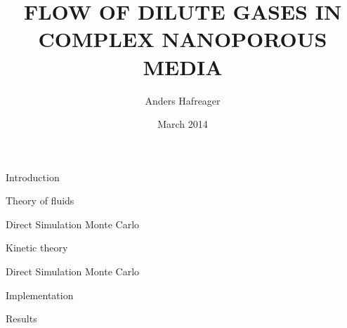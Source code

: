 \documentclass[twoside,english, a4paper, 11pt]{uiofysmaster}
\author{Anders Hafreager}
\title{\uppercase{Flow of dilute gases in complex nanoporous media}}
\date{March 2014}
\begin{document}
\maketitle
\clearpage

\begin{abstract}

\end{abstract}

\begin{acknowledgements}
  
\end{acknowledgements}

\tableofcontents
\clearpage
\listoffigures
\clearpage
\listoftables

\begin{chapter}{Introduction}
  
\end{chapter}

\begin{chapter}{Theory of fluids}
  \label{chap:theory_of_fluids}
  
  
\end{chapter}

\begin{part}{Direct Simulation Monte Carlo}
\label{part:dsmc}
\begin{chapter}{Kinetic theory}
  \label{chap:kinetic_theory}
  
  
  
  
\end{chapter}

\begin{chapter}{Direct Simulation Monte Carlo}
  \label{chap:dsmc}
  
  
  
  
  
  
  
  
\end{chapter}
\begin{chapter}{Implementation}
\label{chap:dsmc_implementation}
  
  
  
  
  
\end{chapter}
\begin{chapter}{Results}
  \label{chap:dsmc_results}
  
  
\end{chapter}
\end{part}
\end{document}
